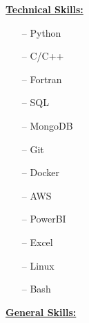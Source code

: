 \vspace*{4mm}

\vspace*{-2mm}
\begin{multicols}{2}
    \small

    \colorbox{gray!10}{
        \parbox{0.95\linewidth}{

            \href{.}{\textbf{\large Technical Skills:}}
            \vspace*{-4mm}

            \setlength{\columnsep}{2mm}
            \begin{multicols}{3}
                \begin{itemize}[leftmargin=3.5mm]
                    \itemsep-1mm
                    \item[--] Python
                    \item[--] C/C++
                    \item[--] Fortran
                    \item[--] SQL
                    \item[--] MongoDB
                    \item[--] Git
                    \item[--] Docker
                    \item[--] AWS
                    \item[--] PowerBI
                    \item[--] Excel
                    \item[--] Linux
                    \item[--] Bash
                \end{itemize}
            \end{multicols}
            \vspace*{-2mm}
        }
    }

    \colorbox{gray!10}{
        \parbox{0.95\linewidth}{

            \href{.}{\textbf{\large  General Skills:}}
            \vspace*{-4mm}

}}
\end{multicols}
